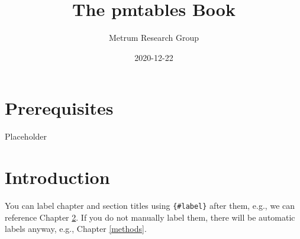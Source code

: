 \documentclass[
]{book}
\title{The pmtables Book}
\author{Metrum Research Group}
\date{2020-12-22}
\newenvironment{Shaded}{\begin{snugshade}}{\end{snugshade}}
\newcommand{\KeywordTok}[1]{\textcolor[rgb]{0.13,0.29,0.53}{\textbf{#1}}}
\newcommand{\NormalTok}[1]{#1}
\newcommand{\OperatorTok}[1]{\textcolor[rgb]{0.81,0.36,0.00}{\textbf{#1}}}
\newcommand{\StringTok}[1]{\textcolor[rgb]{0.31,0.60,0.02}{#1}}
\begin{document}
\maketitle

{
\setcounter{tocdepth}{1}
\tableofcontents
}
\hypertarget{prerequisites}{%
\chapter{Prerequisites}\label{prerequisites}}

Placeholder

\hypertarget{intro}{%
\chapter{Introduction}\label{intro}}

You can label chapter and section titles using \texttt{\{\#label\}} after them, e.g., we can reference Chapter \ref{intro}. If you do not manually label them, there will be automatic labels anyway, e.g., Chapter \ref{methods}.

\begin{Shaded}
\end{Shaded}
\end{document}
